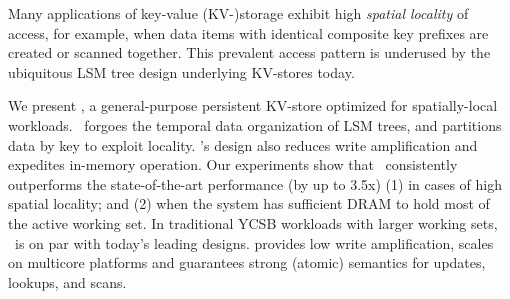 Many applications of key-value (KV-)storage exhibit high \emph{spatial locality}
of access, for example, when data items with identical composite key prefixes are created or scanned together.  
This prevalent access pattern is underused by the ubiquitous LSM tree design underlying KV-stores today.

We present \sys, a general-purpose persistent KV-store optimized for spatially-local workloads. 
\sys\ forgoes the temporal data organization of LSM trees, and partitions data by key to exploit locality. 
%
\sys's design also reduces write amplification and expedites in-memory operation.
Our experiments show that \sys\ consistently outperforms the state-of-the-art performance 
(by up to 3.5x) (1) in cases of high spatial locality; and (2) when the system has sufficient DRAM 
to hold most of the active working set. 
In traditional YCSB workloads with larger working sets, %
\sys\ is on par with today's leading designs.
\sys\/ provides low write amplification, scales on multicore platforms and guarantees strong (atomic) semantics for updates, lookups, and scans. 
